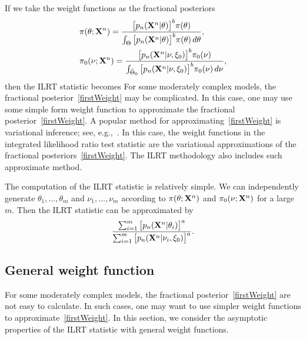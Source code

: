 \documentclass[11pt]{article}
\theoremstyle{plain}
\theoremstyle{definition}
\theoremstyle{remark}
\begin{document}
If we take the weight functions as the fractional posteriors
\begin{equation}\label{firstWeight}
    \begin{split}
&\pi(\theta;\mathbf{X}^{n})=\frac{\big[p_n(\mathbf{X}^{n}|\theta)\big]^b \pi(\theta)}{\int_{\Theta}\big[p_n(\mathbf{X}^{n}|\theta)\big]^b \pi(\theta)\, d\theta},
\\
&\pi_0(\nu;\mathbf{X}^{n})=\frac{\big[p_n(\mathbf{X}^{n}|\nu,
    \xi_0)\big]^b \pi_0(\nu)}{\int_{\tilde{\Theta}_0}\big[p_n(\mathbf{X}^{n}|\nu,\xi_0)\big]^b \pi_0(\nu)\, d\nu},
    \end{split}
\end{equation}
then the ILRT statistic becomes
For some moderately complex models, the fractional posterior~\eqref{firstWeight} may be complicated.
In this case, one may use some simple form weight function to approximate the fractional posterior~\eqref{firstWeight}.
A popular method for approximating~\eqref{firstWeight} is variational inference;
see, e.g.,~\cite{blei2017}.
In this case, the weight functions in the integrated likelihood ratio test statistic are the variational approximations of the fractional posteriors~\eqref{firstWeight}.
The ILRT methodology also includes such approximate method.

The computation of the ILRT statistic is relatively simple.
We can independently generate $\theta_1,\ldots,\theta_m$ and $\nu_1,\ldots,\nu_m$ according to $\pi(\theta;\mathbf{X}^{n})$ and $\pi_0(\nu;\mathbf{X}^{n})$ for a large $m$.
Then the ILRT statistic can be approximated by
\begin{equation*}
    \frac{\sum_{i=1}^m \big[p_n(\mathbf{X}^{n}|\theta_i)\big]^{a}}{\sum_{i=1}^m\big[p_n(\mathbf{X}^{n}|\nu_i,\xi_0)\big]^{a}}.
\end{equation*}





\subsection{General weight function}
For some moderately complex models, the fractional posterior~\eqref{firstWeight} are not easy to calculate.
In such cases, one may want to use simpler weight functions to approximate~\eqref{firstWeight}.
In this section, we consider the asymptotic properties of the ILRT statistic with general weight functions.
\end{document}
